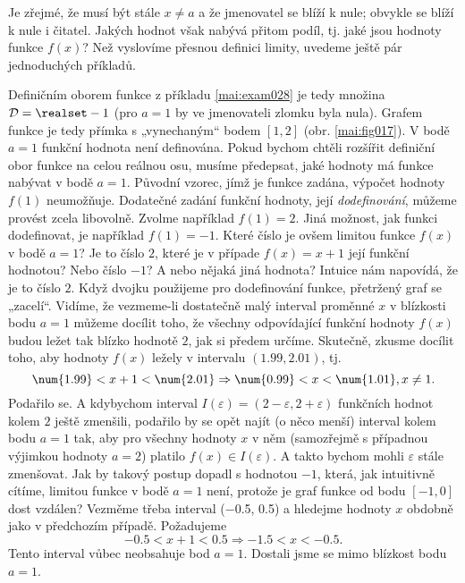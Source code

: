     Je zřejmé, že musí být stále \(x \neq a\) a že jmenovatel se blíží k nule; obvykle se blíží k
    nule i čitatel. Jakých hodnot však nabývá přitom podíl, tj. jaké jsou hodnoty funkce \(f(x)\)?
    Než vyslovíme přesnou definici limity, uvedeme ještě pár jednoduchých příkladů.

      

    Definičním oborem funkce z příkladu \ref{mai:exam028} je tedy množina \(\mathcal{D} = \realset -
    {1}\) (pro \(a = 1\) by ve jmenovateli zlomku byla nula). Grafem funkce je tedy přímka s
    „vynechaným“ bodem \([1, 2]\) (obr. \ref{mai:fig017}). V bodě \(a = 1\) funkční hodnota není
    definována. Pokud bychom chtěli rozšířit definiční obor funkce na celou reálnou osu, musíme
    předepsat, jaké hodnoty má funkce nabývat v bodě \(a = 1\). Původní vzorec, jímž je funkce
    zadána, výpočet hodnoty \(f(1)\) neumožňuje. Dodatečné zadání funkční hodnoty, její
    \emph{dodefinování}, můžeme provést zcela libovolně. Zvolme například \(f(1) = 2\). Jiná
    možnost, jak funkci dodefinovat, je například \(f(1) =-1\). Které číslo je ovšem limitou funkce
    \(f(x)\) v bodě \(a = 1\)? Je to číslo \(2\), které je v případe \(f(x) = x+1\) její funkční
    hodnotou? Nebo číslo \(-1\)? A nebo nějaká jiná hodnota? Intuice nám napovídá, že je to číslo
    \(2\). Když dvojku použijeme pro dodefinování funkce, přetržený graf se „zacelí“. Vidíme, že
    vezmeme-li dostatečně malý interval proměnné \(x\) v blízkosti bodu \(a=1\) můžeme docílit toho,
    že všechny odpovídající funkční hodnoty \(f(x)\) budou ležet tak blízko hodnotě \(2\), jak si
    předem určíme. Skutečně, zkusme docílit toho, aby hodnoty \(f(x)\) ležely v intervalu
    \((\num{1.99}, \num{2.01})\), tj.
    \begin{equation*}
      \num{1.99} < x + 1 < \num{2.01} \Rightarrow \num{0.99} < x < \num{1.01},\hfill x\neq1.
    \end{equation*}
    Podařilo se. A kdybychom interval \(I(\varepsilon) = (2 - \varepsilon, 2 + \varepsilon)\) 
    funkčních hodnot kolem \(2\) ještě zmenšili, podařilo by se opět najít (o něco menší) interval 
    kolem bodu \(a = 1\) tak, aby pro všechny hodnoty \(x\) v něm (samozřejmě s případnou výjimkou 
    hodnoty \(a =2\)) platilo \(f(x)\in I(\varepsilon)\). A takto bychom mohli \(\varepsilon\) 
    stále zmenšovat. Jak by takový postup dopadl s hodnotou \(-1\), která, jak intuitivně cítíme, 
    limitou funkce v bodě \(a = 1\) není, protože je graf funkce od bodu \([-1,0]\) dost vzdálen? 
    Vezměme třeba interval (\num{-0.5}, \num{0.5}) a hledejme hodnoty \(x\) obdobně jako v 
    předchozím případě. Požadujeme
    \begin{equation*}
      \num{-0.5} < x + 1 < \num{0.5} \Rightarrow \num{-1.5} < x < \num{-0.5}.
    \end{equation*}
    Tento interval vůbec neobsahuje bod \(a = 1\). Dostali jsme se mimo blízkost bodu \(a = 1\).

